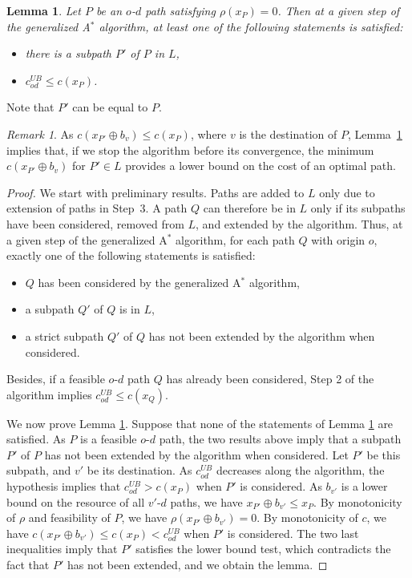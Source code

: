 \documentclass[11pt]{amsart}
\theoremstyle{plain}
\newtheorem{lem}[theo]{Lemma}
\theoremstyle{remark}
\newtheorem{rem}{Remark}
\newcommand{\rplus}{\oplus}
\newcommand{\rleq}{\leqslant}
\newcommand{\rcost}{c}
\newcommand{\rmeas}{\rho}
\newcommand{\re}{x}
\begin{document}
\begin{lem}\label{lem:upperBoundInGeneralizedAstar}
Let $P$ be an $o$-$d$ path satisfying $\rmeas(\re_{P}) = 0$. Then at a given step of the generalized A$^{*}$ algorithm, at least one of the following statements is satisfied:
\begin{itemize}
	\item there is a subpath $P'$ of $P$ in $L$,
	\item $c_{od}^{UB} \leq \rcost(\re_{P})$.
\end{itemize}
\end{lem}
Note that $P'$ can be equal to $P$.

\begin{rem}\label{rem:gapLowerBound}
	As $c(\re_{P'}\rplus b_{v}) \leq c(\re_{P})$, where $v$ is the destination of $P$, Lemma~\ref{lem:upperBoundInGeneralizedAstar} implies that, if we stop the algorithm before its convergence, the minimum $c(\re_{P'}\rplus b_{v})$ for $P' \in L$ provides a lower bound on the cost of an optimal path.
\end{rem}

\begin{proof}
We start with preliminary results. Paths are added to $L$ only due to extension of paths in Step~3. A path $Q$ can therefore be in $L$ only if its subpaths have been considered, removed from $L$, and extended by the algorithm. Thus, at a given step of the generalized A$^{*}$ algorithm, for each path $Q$ with origin $o$, exactly one of the following statements is satisfied:
\begin{itemize}
	\item $Q$ has been considered by the generalized A$^{*}$ algorithm,
	\item a subpath $Q'$ of $Q$ is in $L$,
	\item a strict subpath $Q'$ of $Q$ has not been extended by the algorithm when considered. 
\end{itemize}
Besides, if a feasible $o$-$d$ path $Q$ has already been considered, Step 2 of the algorithm implies $c_{od}^{UB} \leq \rcost(\re_{Q})$.

We now prove Lemma \ref{lem:upperBoundInGeneralizedAstar}. Suppose that none of the statements of Lemma \ref{lem:upperBoundInGeneralizedAstar} are satisfied. As $P$ is a feasible $o$-$d$ path, the two results above imply that a subpath $P'$ of $P$ has not been extended by the algorithm when considered. Let $P'$ be this subpath, and $v'$ be its destination. As $c_{od}^{UB}$ decreases along the algorithm, the hypothesis implies that $c_{od}^{UB} > \rcost(\re_{P})$ when $P'$ is considered. As $b_{v'}$ is a lower bound on the resource of all $v'$-$d$ paths, we have $\re_{P'} \rplus b_{v'} \rleq \re_{P}$. By monotonicity of $\rmeas$ and feasibility of $P$, we have $\rmeas(\re_{P'} \rplus b_{v'}) = 0$. By monotonicity of $\rcost$, we have $\rcost(\re_{P'} \rplus b_{v'}) \leq \rcost(\re_{P}) < c_{od}^{UB}$ when $P'$ is considered. The two last inequalities imply that $P'$ satisfies the lower bound test, which contradicts the fact that $P'$ has not been extended, and we obtain the lemma.
\end{proof}
\end{document}
